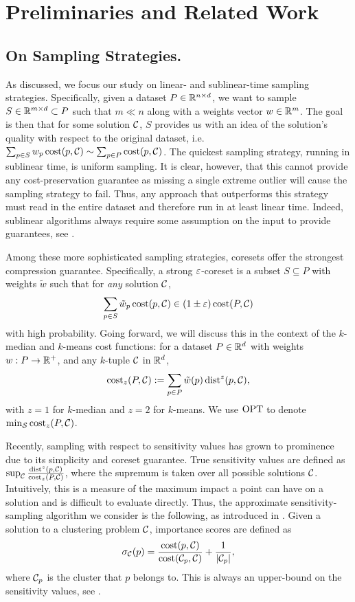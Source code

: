 \section{Preliminaries and Related Work}

\subsection{On Sampling Strategies.}
\label{ssec:sens_sampling}

As discussed, we focus our study on linear- and sublinear-time sampling strategies. Specifically, given a dataset $P \in \mathbb{R}^{n \times d}$, we want to sample $S
\in \mathbb{R}^{m \times d} \subset P$ such that $m \ll n$ along with a weights vector $w \in \mathbb{R}^m$. The goal is then that for some solution $\mathcal C$, $S$
provides us with an idea of the solution's quality with respect to the original dataset, i.e. $\sum_{p \in S} w_p \operatorname{cost}(p, \mathcal C) \sim \sum_{p \in P} \operatorname{cost}(p,
\mathcal C)$. 
The quickest sampling strategy, running in sublinear time, is uniform sampling. It is clear, however, that this cannot provide any cost-preservation guarantee
as missing a single extreme outlier will cause the sampling strategy to fail. Thus, any approach that outperforms this strategy must read in the entire dataset
and therefore run in at least linear time. Indeed, sublinear algorithms always require some assumption on the input to provide guarantees, see \cite{Ben-David07,czumaj2007sublinear,HJJ23,meyerson2004k}.

Among these more sophisticated sampling strategies, coresets offer the strongest compression guarantee. Specifically, a strong $\varepsilon$-coreset is a subset $S
\subseteq P$ with weights $\tilde w$ such that for \emph{any} solution $\mathcal C$, \[\sum_{p \in S} \tilde w_p \operatorname{cost}(p, \mathcal C) \in (1 \pm \varepsilon) \operatorname{cost}(P, \mathcal C)\] with
high probability.  Going forward, we will discuss this in the context of the $k$-median and $k$-means cost functions: for a dataset $P \in \mathbb{R}^d$ with weights $w
: P \rightarrow \mathbb{R}^+$, and any $k$-tuple $\mathcal C$ in $\mathbb{R}^d$, \[\operatorname{cost}_z(P, \mathcal C) := \sum_{p \in P} \tilde w(p) \operatorname{dist}^z(p, \mathcal C),\] with
$z=1$ for $k$-median and $z=2$ for $k$-means. We use $\text{OPT}$ to denote $\min_{\mathcal S} \operatorname{cost}_z(P, \mathcal C)$.

Recently, sampling with respect to sensitivity values has grown to prominence due to its simplicity and coreset guarantee.  True sensitivity values are defined
as $\sup_{\mathcal C} \frac{\operatorname{dist}^z(p, \mathcal C)}{\operatorname{cost}_z(P, \mathcal C)}$, where the supremum is taken over all possible solutions $\mathcal C$. Intuitively, this is a measure
of the maximum impact a point can have on a solution and is difficult to evaluate directly.
Thus, the approximate sensitivity-sampling algorithm we consider is the following, as introduced in \cite{FeldmanL11}.
Given a solution to a clustering problem $\mathcal C$, importance scores are defined as
\begin{equation}
\label{eq:sensitivity}
\sigma_\mathcal C(p) = \dfrac{\operatorname{cost}(p, \mathcal C)}{\operatorname{cost}(\mathcal C_{p}, \mathcal C)} + \dfrac{1}{|\mathcal C_p|},
\end{equation}
where $\mathcal C_p$ is the cluster that $p$ belongs to. This is always an upper-bound on the sensitivity values, see \cite{FL11,FeldmanSS20}.

